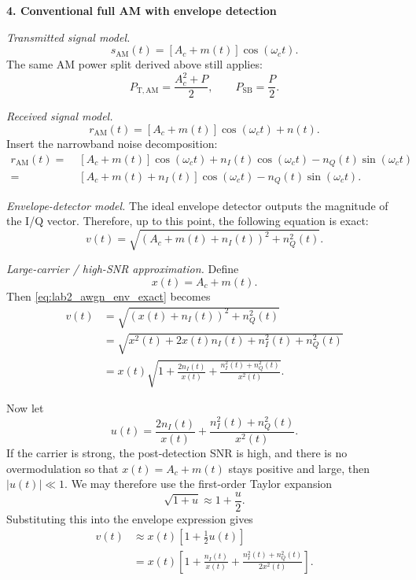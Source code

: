 \begin{tcolorbox}[breakable, colback=cyan!4!white, colframe=cyan!60!black,
title={\textbf{Intuition: Step-by-Step Output SNR Models Under AWGN}}]
\textbf{4. Conventional full AM with envelope detection}

\emph{Transmitted signal model.}
\begin{equation}
s_{\mathrm{AM}}(t)=\left[A_c+m(t)\right]\cos(\omega_c t).
\end{equation}
The same AM power split derived above still applies:
\begin{equation}
P_{\mathrm{T,AM}}=\frac{A_c^2+P}{2},
\qquad
P_{\mathrm{SB}}=\frac{P}{2}.
\end{equation}

\emph{Received signal model.}
\begin{equation}
r_{\mathrm{AM}}(t)=\left[A_c+m(t)\right]\cos(\omega_c t)+n(t).
\end{equation}
Insert the narrowband noise decomposition:
\begin{align}
r_{\mathrm{AM}}(t)
=\;&
\left[A_c+m(t)\right]\cos(\omega_c t)
+n_I(t)\cos(\omega_c t)-n_Q(t)\sin(\omega_c t)\nonumber\\
=\;&
\left[A_c+m(t)+n_I(t)\right]\cos(\omega_c t)-n_Q(t)\sin(\omega_c t).
\end{align}

\emph{Envelope-detector model.}
The ideal envelope detector outputs the magnitude of the I/Q vector. Therefore,
up to this point, the following equation is exact:
\begin{equation}
v(t)=\sqrt{\left(A_c+m(t)+n_I(t)\right)^2+n_Q^2(t)}.
\label{eq:lab2_awgn_env_exact}
\end{equation}

\emph{Large-carrier / high-SNR approximation.}
Define
\begin{equation}
x(t)=A_c+m(t).
\end{equation}
Then \eqref{eq:lab2_awgn_env_exact} becomes
\begin{align}
v(t)
&=
\sqrt{\left(x(t)+n_I(t)\right)^2+n_Q^2(t)}\nonumber\\
&=
\sqrt{x^2(t)+2x(t)n_I(t)+n_I^2(t)+n_Q^2(t)}\nonumber\\
&=
x(t)\sqrt{1+\frac{2n_I(t)}{x(t)}
+\frac{n_I^2(t)+n_Q^2(t)}{x^2(t)}}.
\end{align}

Now let
\begin{equation}
u(t)=\frac{2n_I(t)}{x(t)}+\frac{n_I^2(t)+n_Q^2(t)}{x^2(t)}.
\end{equation}
If the carrier is strong, the post-detection SNR is high, and there is no
overmodulation so that $x(t)=A_c+m(t)$ stays positive and large, then
$\lvert u(t)\rvert \ll 1$. We may therefore use the first-order Taylor
expansion
\begin{equation}
\sqrt{1+u}\approx 1+\frac{u}{2}.
\end{equation}
Substituting this into the envelope expression gives
\begin{align}
v(t)
&\approx
x(t)\left[1+\frac{1}{2}u(t)\right]\nonumber\\
&=
x(t)\left[
1+\frac{n_I(t)}{x(t)}
+\frac{n_I^2(t)+n_Q^2(t)}{2x^2(t)}
\right].
\end{align}


\end{tcolorbox}
